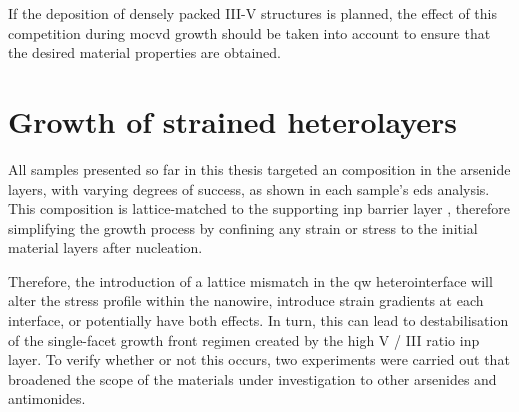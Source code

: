 If the deposition of densely packed III-V structures is planned, the effect of this competition during \acs{mocvd} growth should be taken into account to ensure that the desired material properties are obtained.

\section{Growth of strained heterolayers}

All samples presented so far in this thesis targeted an  composition in the arsenide layers, with varying degrees of success, as shown in each sample's \acs{eds} analysis. This composition is lattice-matched to the supporting \acs{inp} barrier layer \cite{Pearsall1980, Sugii1983, Wagner1970}, therefore simplifying the growth process by confining any strain or stress to the initial material layers after nucleation.

Therefore, the introduction of a lattice mismatch in the \acl{qw} heterointerface will alter the stress profile within the nanowire, introduce strain gradients at each interface, or potentially have both effects. In turn, this can lead to destabilisation of the  single-facet growth front regimen created by the high V / III ratio \acs{inp} layer. To verify whether or not this occurs, two experiments were carried out that broadened the scope of the materials under investigation to other arsenides and antimonides. 

